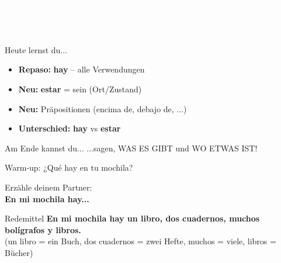 \documentclass[aspectratio=169, 11pt]{beamer}
\newcommand{\es}[1]{\textbf{\textcolor{spanischrot}{#1}}}
\newcommand{\estar}[1]{\textbf{\textcolor{blau}{#1}}}
\begin{document}
\begin{frame}
\begin{center}
\vspace{1cm}
{\Huge\bfseries\textcolor{white}{Hay y estar}}\\[0.5cm]
{\Large\textcolor{white}{Wo ist was? Was gibt es?}}\\[1.5cm]
{\large\textcolor{white}{Spanisch · Klasse 7 · Unidad 2}}
\end{center}
\end{frame}

\begin{frame}{Heute lernst du...}
\begin{itemize}
    \item[\textcolor{spanischrot}{\textbullet}] \textbf{Repaso:} \es{hay} -- alle Verwendungen
    \item[\textcolor{spanischrot}{\textbullet}] \textbf{Neu:} \estar{estar} = sein (Ort/Zustand)
    \item[\textcolor{spanischrot}{\textbullet}] \textbf{Neu:} Präpositionen (encima de, debajo de, ...)
    \item[\textcolor{spanischrot}{\textbullet}] \textbf{Unterschied:} \es{hay} vs \estar{estar}
\end{itemize}

\vspace{0.8cm}

\begin{block}{Am Ende kannst du...}
...sagen, WAS ES GIBT und WO ETWAS IST!
\end{block}
\end{frame}

\begin{frame}{Warm-up: ¿Qué hay en tu mochila?}

\begin{center}
{\Large Erzähle deinem Partner:}\\[0.5cm]
{\Huge \es{En mi mochila hay...}}
\end{center}

\vspace{1cm}

\begin{block}{Redemittel}
\es{En mi mochila hay un libro, dos cuadernos, muchos bolígrafos y libros.}\\
{\small\textcolor{dunkelgrau}{(un libro = ein Buch, dos cuadernos = zwei Hefte, muchos = viele, libros = Bücher)}}
\end{block}

\end{frame}
\end{document}
